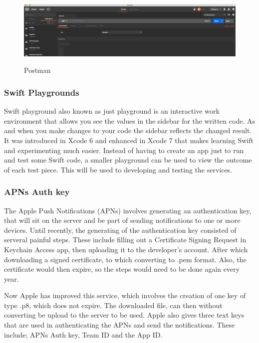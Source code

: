 \begin{figure}[!h]
    \caption{Postman}
    \centering
    \includegraphics[width=150mm]{images/postman}
    \label{fig:postman}
\end{figure}


\subsubsection{Swift Playgrounds}

Swift \cite{xcode} playground also known as just playground is an interactive work environment that allows you see the values in the sidebar for the written code. As and when you make changes to your code the sidebar reflects the changed result. It was introduced in Xcode 6 and enhanced in Xcode 7 that makes learning Swift and experimenting much easier. Instead of having to create an app just to run and test some Swift code, a smaller playground can be used to view the outcome of each test piece. This will be used to developing and testing the services.

\subsubsection{APNs Auth key}

The Apple Push Notifications (APNs) \cite{apns_web} involves generating an authentication key, that will sit on the server and be part of sending notifications to one or more devices. Until recently, the generating of the authentication key consisted of serveral painful steps. These include filling out a Certificate Signing Request in Keychain Access app, then uploading it to the developer's account. After which downloading a signed certificate, to which converting to .pem format. Also, the certificate would then expire, so the steps would need to be done again every year.

Now Apple has improved this service, which involves the creation of one key of type .p8, which does not expire. The downloaded file, can then without converting be upload to the server to be used. Apple also gives three text keys that are used in authenticating the APNs and send the notifications. These include; APNs Auth key, Team ID and the App ID.

